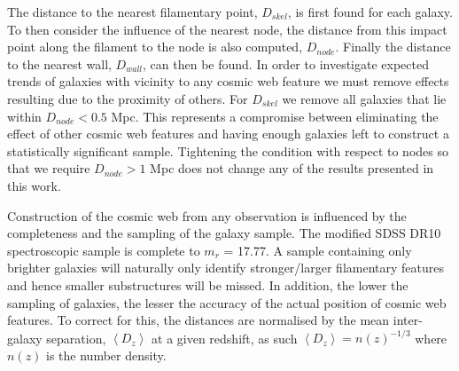 The distance to the nearest filamentary point, $D_{skel}$, is first found for each galaxy. To then consider the influence of the nearest node, the distance from this impact point along the filament to the node is also computed, $D_{node}$. Finally the distance to the nearest wall, $D_{wall}$, can then be found. In order to investigate expected trends of galaxies with vicinity to any cosmic web feature we must remove effects resulting due to the proximity of others. For $D_{skel}$ we remove all galaxies that lie within $D_{node} < 0.5$ Mpc. 
This represents a compromise between eliminating the effect of other cosmic web features and having enough galaxies left to construct a statistically significant sample. Tightening the condition with respect to nodes so that we require $D_{node} > 1$ Mpc does not change any of the results presented in this work. 

Construction of the cosmic web from any observation is influenced by the completeness and the sampling of the galaxy sample. The modified SDSS DR10 spectroscopic sample is complete to $m_r$ = 17.77. A sample containing only brighter galaxies will naturally only identify stronger/larger filamentary features and hence smaller substructures will be missed. In addition, the lower the sampling of galaxies, the lesser the accuracy of the actual position of cosmic web features. To correct for this, the distances are normalised by the mean inter-galaxy separation, $\left\langle D_z \right\rangle$ at a given redshift, as such $\left\langle D_z \right\rangle = n(z)^{-1/3}$ where $n(z)$ is the number density. 

